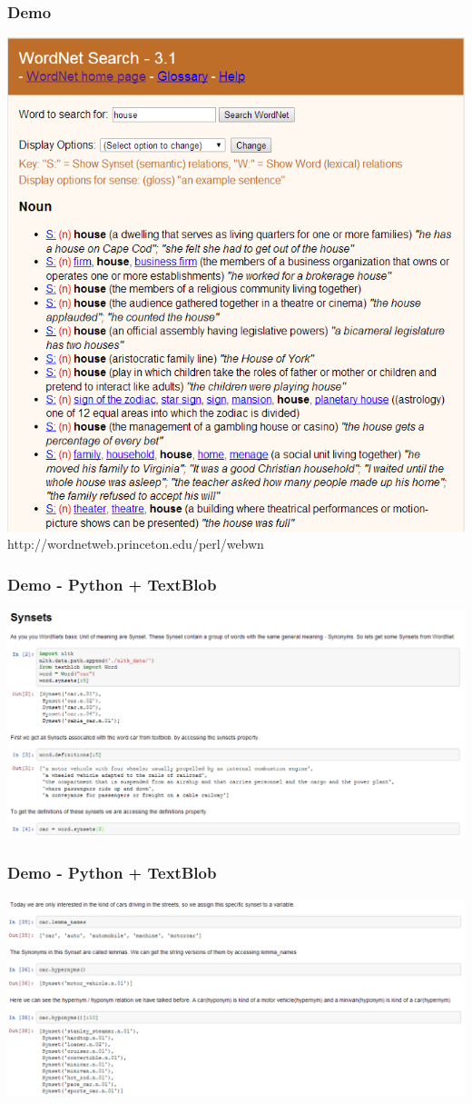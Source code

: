 \begin{frame}
\frametitle{Demo}
\includegraphics[scale=0.29]{img/wordnet_demo.png}\\
http://wordnetweb.princeton.edu/perl/webwn
\end{frame}

\begin{frame}
\frametitle{Demo - Python + TextBlob}
\includegraphics[scale=0.29]{img/wordnet_ip1.PNG}\\
\end{frame}

\begin{frame}
\frametitle{Demo - Python + TextBlob}
\includegraphics[scale=0.29]{img/wordnet_ip2.PNG}\\
\end{frame}


